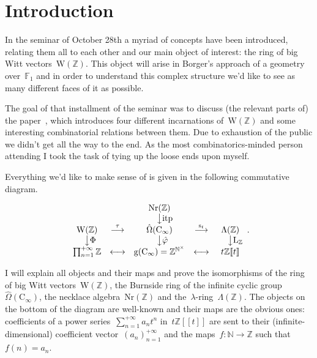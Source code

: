 \section*{Introduction}
In the seminar of October 28th a myriad of concepts have been introduced, relating them all to each other and our main object of interest: the ring of big Witt vectors~$\mathrm{W}(\mathbb{Z})$. This object will arise in Borger's approach of a geometry over~$\mathbb{F}_1$ and in order to understand this complex structure we'd like to see as many different faces of it as possible.

The goal of that installment of the seminar was to discuss (the relevant parts of) the paper~\cite{the-burnside-ring}, which introduces four different incarnations of~$\mathrm{W}(\mathbb{Z})$ and some interesting combinatorial relations between them. Due to exhaustion of the public we didn't get all the way to the end. As the most combinatorics-minded person attending I took the task of tying up the loose ends upon myself.

Everything we'd like to make sense of is given in the following commutative diagram.

\begin{equation}
  \label{equation:commutative-diagram}
  \begin{array}{ccccc}
    & & \mathrm{Nr}(\mathbb{Z}) & & \\
    & & \phantom{\textrm{itp}}\big\downarrow\textrm{itp} & & \\
    \mathrm{W}(\mathbb{Z}) & \overset{\tau}{\longrightarrow} & \hat{\Omega}(\mathrm{C}_\infty) & \overset{\mathrm{s}_t}{\longrightarrow} & \Lambda(\mathbb{Z}) \\
    \phantom{\Phi}\big\downarrow\Phi & & \phantom{\hat{\varphi}}\big\downarrow\hat{\varphi} & & \phantom{\mathrm{L}_{\mathbb{Z}}}\big\downarrow\mathrm{L}_{\mathbb{Z}} \\
    \prod_{n=1}^{+\infty}\mathbb{Z} & \longleftrightarrow & \mathrm{g}(\mathrm{C}_\infty)=\mathbb{Z}^{\mathbb{N}^\times} & \longleftrightarrow & t\mathbb{Z}[\![t]\!]
  \end{array}.
\end{equation}

I will explain all objects and their maps and prove the isomorphisms of the ring of big Witt vectors~$\mathrm{W}(\mathbb{Z})$, the Burnside ring of the infinite cyclic group~$\hat{\Omega}(\mathrm{C}_\infty)$, the necklace algebra~$\mathrm{Nr}(\mathbb{Z})$ and the~$\lambda$\nobreakdash-ring~$\Lambda(\mathbb{Z})$. The objects on the bottom of the diagram are well-known and their maps are the obvious ones: coefficients of a power series~$\sum_{n=1}^{+\infty}a_nt^n$ in~$t\mathbb{Z}[\![t]\!]$ are sent to their (infinite-dimensional) coefficient vector~$(a_n)_{n=1}^{+\infty}$ and the maps~$f\colon\mathbb{N}\to\mathbb{Z}$ such that~$f(n)=a_{n}$.

